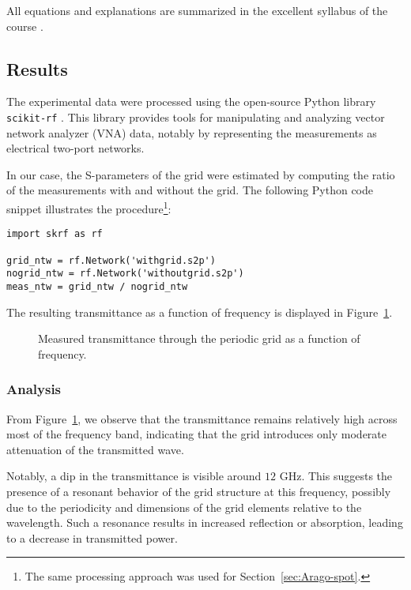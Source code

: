 \documentclass{article}
\begin{document}
All equations and explanations are summarized in the excellent syllabus of the course \cite{syllabus}.


\subsection{Results}

The experimental data were processed using the open-source Python library \texttt{scikit-rf} \cite{scikit-rf}. This library provides tools for manipulating and analyzing vector network analyzer (VNA) data, notably by representing the measurements as electrical two-port networks.

In our case, the S-parameters of the grid were estimated by computing the ratio of the measurements with and without the grid. The following Python code snippet illustrates the procedure\footnote{The same processing approach was used for Section~\ref{sec:Arago-spot}.}:

\begin{verbatim}
import skrf as rf

grid_ntw = rf.Network('withgrid.s2p')
nogrid_ntw = rf.Network('withoutgrid.s2p')
meas_ntw = grid_ntw / nogrid_ntw
\end{verbatim}

The resulting transmittance as a function of frequency is displayed in Figure~\ref{fig:pow-freq-periodic}.

\begin{figure}[H]
\centering

\caption{Measured transmittance through the periodic grid as a function of frequency.}
\label{fig:pow-freq-periodic}
\end{figure}

\subsubsection{Analysis}

From Figure~\ref{fig:pow-freq-periodic}, we observe that the transmittance remains relatively high across most of the frequency band, indicating that the grid introduces only moderate attenuation of the transmitted wave.

Notably, a dip in the transmittance is visible around \( 12 \) GHz. This suggests the presence of a resonant behavior of the grid structure at this frequency, possibly due to the periodicity and dimensions of the grid elements relative to the wavelength. Such a resonance results in increased reflection or absorption, leading to a decrease in transmitted power.
\end{document}
